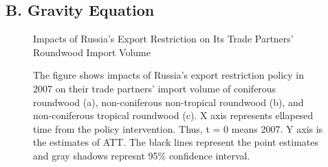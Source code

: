 \documentclass[a4paper,12pt]{article}
\begin{document}
\subsection*{B. Gravity Equation}
\begin{figure}[H] 
    \centering
    \caption{Impacts of Russia's Export Restriction on Its Trade Partners' Roundwood Import Volume}
    \caption*{\small{The figure shows impacts of Russia's export restriction policy in 2007 on their trade partners' import volume of coniferous roundwood (a), non-coniferous non-tropical roundwood (b), and non-coniferous tropical roundwood (c). X axis represents ellapesed time from the policy intervention. Thus, t = 0 means 2007. Y axis is the estimates of ATT. The black lines represent the point estimates and gray shadows represnt 95\% confidence interval.}}
    \label{fig:gravity_dynamic}
\end{figure}
\end{document}
